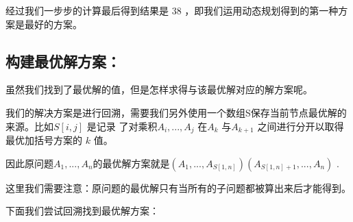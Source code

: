 \newpage

经过我们一步步的计算最后得到结果是 $38$ ，即我们运用动态规划得到的第一种方案是最好的方案。

\subsection{构建最优解方案：}

虽然我们找到了最优解的值，但是怎样求得与该最优解对应的解方案呢。

我们的解决方案是进行回溯，需要我们另外使用一个数组S保存当前节点最优解的来源。比如$S[i,j]$ 是记录 了对乘积$A_i,...,A_j$ 在$A_k$ 与$A_{k + 1}$ 之间进行分开以取得最优加括号方案的 $k$ 值。

因此原问题$A_1,...,A_n$的最优解方案就是$(A_1,...,A_{S[1,n]})(A_{S[1,n] + 1},...,A_n)$ .

这里我们需要注意：原问题的最优解只有当所有的子问题都被算出来后才能得到。

下面我们尝试回溯找到最优解方案：

